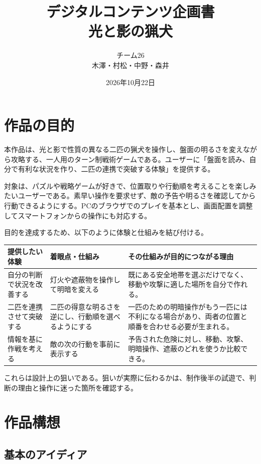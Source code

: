 \documentclass[a4paper,11pt,dvipdfmx]{jsarticle}
\title{デジタルコンテンツ企画書\\\large 光と影の猟犬}
\author{チーム26\\木澤・村松・中野・森井}
\date{2026年10月22日}
\begin{document}
\maketitle



\section{作品の目的}

本作品は、光と影で性質の異なる二匹の猟犬を操作し、盤面の明るさを変えながら攻略する、一人用のターン制戦術ゲームである。ユーザーに「盤面を読み、自分で有利な状況を作り、二匹の連携で突破する体験」を提供する。

対象は、パズルや戦略ゲームが好きで、位置取りや行動順を考えることを楽しみたいユーザーである。素早い操作を要求せず、敵の予告や明るさを確認してから行動できるようにする。PCのブラウザでのプレイを基本とし、画面配置を調整してスマートフォンからの操作にも対応する。

目的を達成するため、以下のように体験と仕組みを結び付ける。

{\small
\begin{longtable}{@{}P{0.20\dimexpr{}\tabcolsep\relax}P{0.34\dimexpr{}\tabcolsep\relax}P{0.46\dimexpr{}\tabcolsep\relax}@{}}
\toprule
\textbf{提供したい体験} & \textbf{着眼点・仕組み} & \textbf{その仕組みが目的につながる理由} \\
\midrule
\endhead
自分の判断で状況を改善する & 灯火や遮蔽物を操作して明暗を変える & 既にある安全地帯を選ぶだけでなく、移動や攻撃に適した場所を自分で作れる。 \\
二匹を連携させて突破する & 二匹の得意な明るさを逆にし、行動順を選べるようにする & 一匹のための明暗操作がもう一匹には不利になる場合があり、両者の位置と順番を合わせる必要が生まれる。 \\
情報を基に作戦を考える & 敵の次の行動を事前に表示する & 予告された危険に対し、移動、攻撃、明暗操作、遮蔽のどれを使うか比較できる。 \\
\bottomrule
\end{longtable}
}

これらは設計上の狙いである。狙いが実際に伝わるかは、制作後半の試遊で、判断の理由と操作に迷った箇所を確認する。

\section{作品構想}

\subsection{基本のアイディア}
\end{document}
